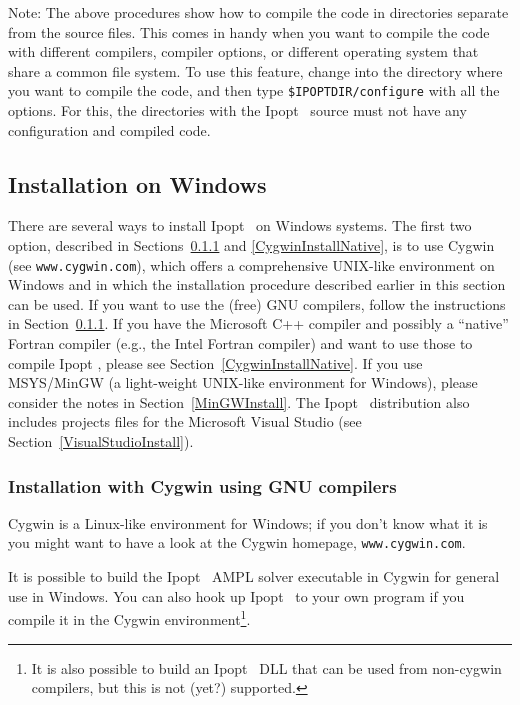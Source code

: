 \documentclass[10pt]{article}
\newcommand{\Ipopt}{{\sc Ipopt }}
\begin{document}
Note: The above procedures show how to compile the code in directories
separate from the source files.  This comes in handy when you want to
compile the code with different compilers, compiler options, or
different operating system that share a common file system.  To use
this feature, change into the directory where you want to compile the
code, and then type {\tt \$IPOPTDIR/configure} with all the options.
For this, the directories with the \Ipopt\ source must not have any
configuration and compiled code.

\subsection{Installation on Windows}\label{WindowsInstall}

There are several ways to install \Ipopt\ on Windows systems.  The
first two option, described in Sections~\ref{CygwinInstall} and
\ref{CygwinInstallNative}, is to use Cygwin (see
\texttt{www.cygwin.com}), which offers a comprehensive UNIX-like
environment on Windows and in which the installation procedure
described earlier in this section can be used.  If you want to use the
(free) GNU compilers, follow the instructions in
Section~\ref{CygwinInstall}.  If you have the Microsoft C++ compiler
and possibly a ``native'' Fortran compiler (e.g., the Intel Fortran
compiler) and want to use those to compile \Ipopt, please see
Section~\ref{CygwinInstallNative}.  If you use MSYS/MinGW (a
light-weight UNIX-like environment for Windows), please consider the
notes in Section~\ref{MinGWInstall}.
%
The \Ipopt\ distribution also includes projects files for the
Microsoft Visual Studio (see Section~\ref{VisualStudioInstall}).

\subsubsection{Installation with Cygwin using GNU compilers}\label{CygwinInstall}

Cygwin is a Linux-like environment for Windows; if you don't know what
it is you might want to have a look at the Cygwin homepage,
\texttt{www.cygwin.com}.

It is possible to build the \Ipopt\ AMPL solver executable in Cygwin
for general use in Windows.  You can also hook up \Ipopt\ to your own
program if you compile it in the Cygwin environment\footnote{It is
  also possible to build an \Ipopt\ DLL that can be used from
  non-cygwin compilers, but this is not (yet?) supported.}.
\end{document}
